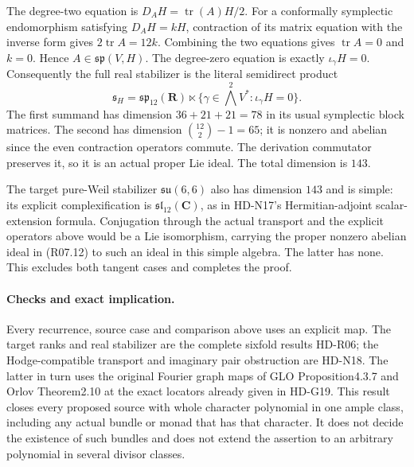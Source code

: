 The degree-two equation is
$D_AH=\operatorname{tr}(A)H/2$. For a conformally symplectic
endomorphism satisfying $D_AH=kH$, contraction of its matrix
equation with the inverse form gives $2\operatorname{tr}A=12k$.
Combining the two equations gives $\operatorname{tr}A=0$ and
$k=0$. Hence $A\in\mathfrak{sp}(V,H)$. The degree-zero
equation is exactly $\iota_\gamma H=0$. Consequently the full
real stabilizer is the literal semidirect product
\[
 \mathfrak s_H=\mathfrak{sp}_{12}(\mathbf R)
          \ltimes\{\gamma\in\bigwedge^2V^*:\iota_\gamma H=0\}.
                                                               \tag{R07.12}
\]
The first summand has dimension $36+21+21=78$ in its usual
symplectic block matrices. The second has dimension
$\binom{12}{2}-1=65$; it is nonzero and abelian since the even
contraction operators commute. The derivation commutator preserves
it, so it is an actual proper Lie ideal. The total dimension is
$143$.

The target pure-Weil stabilizer $\mathfrak{su}(6,6)$ also has
dimension $143$ and is simple: its explicit complexification is
$\mathfrak{sl}_{12}(\mathbf C)$, as in HD-N17's
Hermitian-adjoint scalar-extension formula. Conjugation through
the actual transport and the explicit operators above would be
a Lie isomorphism, carrying the proper nonzero abelian ideal in
(R07.12) to such an ideal in this simple algebra. The latter has
none. This excludes both tangent cases and completes the proof.

\paragraph{Checks and exact implication.}
Every recurrence, source case and comparison above uses an explicit
map. The target ranks and real stabilizer are the complete
sixfold results HD-R06; the Hodge-compatible transport and imaginary
pair obstruction are HD-N18. The latter in turn uses the original
Fourier graph maps of GLO Proposition4.3.7 and Orlov Theorem2.10
at the exact locators already given in HD-G19. This result closes
every proposed source with whole character polynomial in one ample
class, including any actual bundle or monad that has that character.
It does not decide the existence of such bundles and does not
extend the assertion to an arbitrary polynomial in several divisor
classes.
